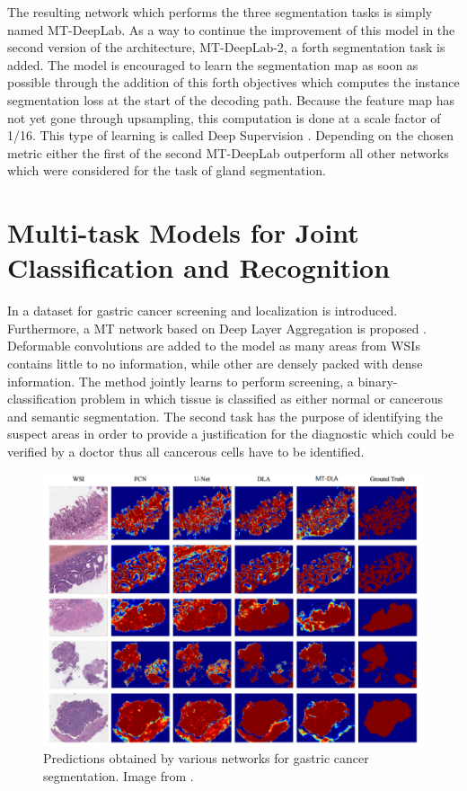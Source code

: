The resulting network which performs the three segmentation tasks is simply named MT-DeepLab. As a way to continue the improvement of this model in the second version of the architecture, MT-DeepLab-2, a forth segmentation task is added. The model is encouraged to learn the segmentation map as soon as possible through the addition of this forth objectives which computes the instance segmentation loss at the start of the decoding path. Because the feature map has not yet gone through upsampling, this computation is done at a scale factor of 1/16. This type of learning is called Deep Supervision \cite{lee2015deeply}. Depending on the chosen metric either the first of the second MT-DeepLab outperform all other networks which were considered for the task of gland segmentation.

\section{Multi-task Models for Joint Classification and Recognition}
\label{class_recog_mt}

In \cite{yu2021large} a dataset for gastric cancer screening and localization is introduced. Furthermore, a MT network based on Deep Layer Aggregation is proposed \cite{yu2018deep}. Deformable convolutions \cite{dai2017deformable} are added to the model as many areas from WSIs contains little to no information, while other are densely packed with dense information. The method jointly learns to perform screening, a binary-classification problem in which tissue is classified as either normal or cancerous and semantic segmentation. The second task has the purpose of identifying the suspect areas in order to provide a justification for the diagnostic which could be verified by a doctor thus all cancerous cells have to be identified. 

\begin{figure}[htb]
    \centering
	\centerline{\includegraphics[scale=0.8]{figures/mtdla_results.png}}
	\caption{Predictions obtained by various networks for gastric cancer segmentation. Image from \cite{yu2021large}.}
	\label{mtdla_results}
\end{figure}

